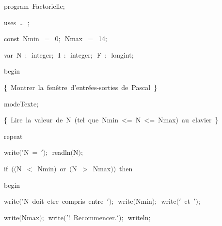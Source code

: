 
{
\parindent {}
\medskip

\carrenoir
\vspace{\neglskip}\mbox{\blc  \idt  \mcl program\idt \ Factorielle$;$
}\par 
\vspace{\neglskip}\mbox{\blc \blk\idt \mcl uses\idt \ \ldots\ $;$
}\par 
\pagebreak[3] 
\vspace{\neglskip}\mbox{\blc  \blk\idt  \mcl const\idt \ Nmin\ $=$\ 0$;$\ Nmax\ $=$\ 14$;$}\par 
\pagebreak[3] 
\vspace{\neglskip}\mbox{\blc  \blk\idt  \mcl var\idt \ N\ $:$\ integer$;$\ I\ $:$\ integer$;$\ F\ $:$\ longint$;$}\par 
\vspace{\neglskip}\mbox{\blc  \idt  \mcl begin\idt }\par 
\vspace{\neglskip}\mbox{\blc  \blk\idt  \cmt  \{\ Montrer\ la\ fenêtre\ d{'}entrées-sorties\ de\ Pascal\ \}\idt }\par 
\vspace{\neglskip}\mbox{\blc  \blk\idt  modeTexte$;$}\par 
\vspace{\neglskip}\mbox{\blc  \blk\idt  \cmt  \{\ Lire\ la\ valeur\ de\ N\ (tel\ que\ Nmin\ <=\ N\ <=\ Nmax)\ au\ clavier\ \}\idt }\par 
\pagebreak[3] 
\vspace{\neglskip}\mbox{\blc  \blk\idt  \mcl repeat\idt \ }\par 
\vspace{\neglskip}\mbox{\blc  \blk\blk\idt  write$($\cha $\scriptstyle '$N\ =\ \idt $\scriptstyle '$$)$$;$\ readln$($N$)$$;$}\par 
\pagebreak[3] 
\vspace{\neglskip}\mbox{\blc  \blk\blk\idt  \mcl if\idt \ $($$($N\ $<$\ Nmin$)$\ \mcl or\idt \ $($N\ $>$\ Nmax$)$$)$\ \mcl then\idt }\par 
\vspace{\neglskip}\mbox{\blc  \blk\blk\blk\idt  \mcl begin\idt }\par 
\vspace{\neglskip}\mbox{\blc  \blk\blk\blk\blk\idt  write$($\cha $\scriptstyle '$N\ doit\ etre\ compris\ entre\ \idt $\scriptstyle '$$)$$;$\ write$($Nmin$)$$;$\ write$($\cha $\scriptstyle '$\ et\ \idt $\scriptstyle '$$)$$;$}\par 
\vspace{\neglskip}\mbox{\blc  \blk\blk\blk\blk\idt  write$($Nmax$)$$;$\ write$($\cha $\scriptstyle '$!\ Recommencer.\idt $\scriptstyle '$$)$$;$\ writeln$;$}\par 
}
